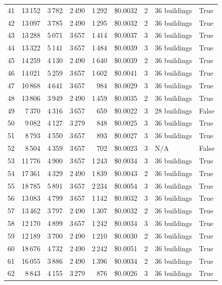 \documentclass[a4paper,11pt]{article}
\begin{document}
\begin{table}[ht]
\begin{tabular}{r r r r r r r p{3cm} l}
41 & 13\,152 & 3\,782 & 2\,490 & 1\,292 & \$0.0032 & 2 & 36 buildings & True \\
42 & 13\,097 & 3\,785 & 2\,490 & 1\,295 & \$0.0032 & 2 & 36 buildings & True \\
43 & 13\,288 & 5\,071 & 3\,657 & 1\,414 & \$0.0037 & 3 & 36 buildings & True \\
44 & 13\,322 & 5\,141 & 3\,657 & 1\,484 & \$0.0039 & 3 & 36 buildings & True \\
45 & 14\,259 & 4\,130 & 2\,490 & 1\,640 & \$0.0039 & 2 & 36 buildings & True \\
46 & 14\,021 & 5\,259 & 3\,657 & 1\,602 & \$0.0041 & 3 & 36 buildings & True \\
47 & 10\,868 & 4\,641 & 3\,657 & 984 & \$0.0029 & 3 & 36 buildings & True \\
48 & 13\,806 & 3\,949 & 2\,490 & 1\,459 & \$0.0035 & 2 & 36 buildings & True \\
49 & 7\,370 & 4\,316 & 3\,657 & 659 & \$0.0022 & 3 & 28 buildings & False \\
50 & 9\,082 & 4\,127 & 3\,279 & 848 & \$0.0025 & 3 & 36 buildings & True \\
51 & 8\,793 & 4\,550 & 3\,657 & 893 & \$0.0027 & 3 & 36 buildings & True \\
52 & 8\,504 & 4\,359 & 3\,657 & 702 & \$0.0023 & 3 & N/A & False \\
53 & 11\,776 & 4\,900 & 3\,657 & 1\,243 & \$0.0034 & 3 & 36 buildings & True \\
54 & 17\,361 & 4\,329 & 2\,490 & 1\,839 & \$0.0043 & 2 & 36 buildings & True \\
55 & 18\,785 & 5\,891 & 3\,657 & 2\,234 & \$0.0054 & 3 & 36 buildings & True \\
56 & 13\,083 & 4\,799 & 3\,657 & 1\,142 & \$0.0032 & 3 & 36 buildings & True \\
57 & 13\,462 & 3\,797 & 2\,490 & 1\,307 & \$0.0032 & 2 & 36 buildings & True \\
58 & 12\,170 & 4\,899 & 3\,657 & 1\,242 & \$0.0034 & 3 & 36 buildings & True \\
59 & 12\,189 & 3\,700 & 2\,490 & 1\,210 & \$0.0030 & 2 & 36 buildings & True \\
60 & 18\,676 & 4\,732 & 2\,490 & 2\,242 & \$0.0051 & 2 & 36 buildings & True \\
61 & 16\,055 & 3\,886 & 2\,490 & 1\,396 & \$0.0034 & 2 & 36 buildings & True \\
62 & 8\,843 & 4\,155 & 3\,279 & 876 & \$0.0026 & 3 & 36 buildings & True \\

\end{tabular}
\end{table}
\end{document}
